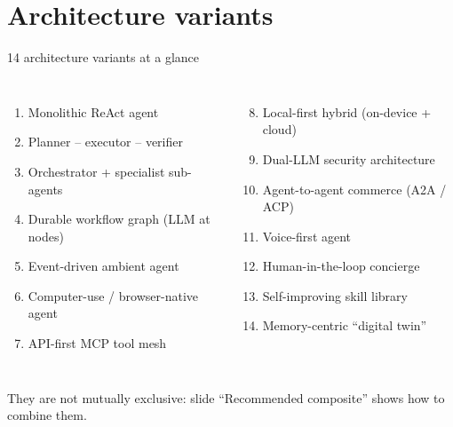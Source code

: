\documentclass[aspectratio=169,10pt]{beamer}
\begin{document}
\section{Architecture variants}
\begin{frame}{14 architecture variants at a glance}
\small
\begin{columns}[T]
\begin{enumerate}
  \item Monolithic ReAct agent
  \item Planner -- executor -- verifier
  \item Orchestrator + specialist sub-agents
  \item Durable workflow graph (LLM at nodes)
  \item Event-driven ambient agent
  \item Computer-use / browser-native agent
  \item API-first MCP tool mesh
\end{enumerate}
\begin{enumerate}\setcounter{enumi}{7}
  \item Local-first hybrid (on-device + cloud)
  \item Dual-LLM security architecture
  \item Agent-to-agent commerce (A2A / ACP)
  \item Voice-first agent
  \item Human-in-the-loop concierge
  \item Self-improving skill library
  \item Memory-centric ``digital twin''
\end{enumerate}
\end{columns}
\vfill
{\scriptsize\color{slate}They are not mutually exclusive: slide ``Recommended composite'' shows how to combine them.}
\end{frame}
\end{document}
